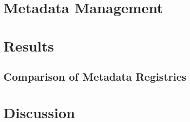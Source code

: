 \documentclass{llncs}
\begin{document}
\section{Metadata Management}



\section{Results}

\subsection{Comparison of Metadata Registries}


\section{Discussion}

 


\newpage




\end{document}

